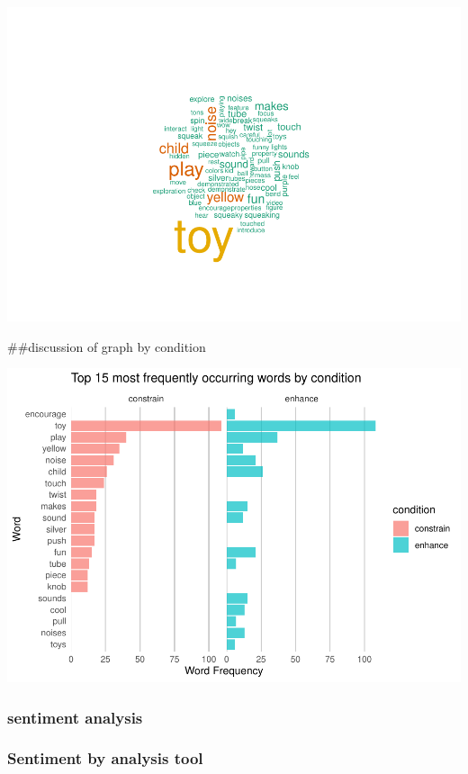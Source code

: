 \documentclass[
  english,
  man]{apa6}
\begin{document}
\includegraphics{capstone640_files/figure-latex/word cloud-1.pdf}

\#\#discussion of graph by condition

\includegraphics{capstone640_files/figure-latex/unnamed-chunk-1-1.pdf}

\hypertarget{sentiment-analysis}{%
\subsubsection{sentiment analysis}\label{sentiment-analysis}}

\hypertarget{sentiment-by-analysis-tool}{%
\subsubsection{Sentiment by analysis tool}\label{sentiment-by-analysis-tool}}
\end{document}
